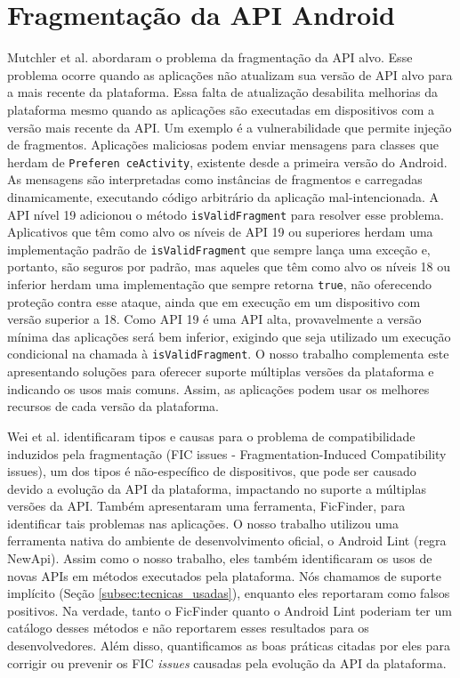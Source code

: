 \section{Fragmentação da API Android}

Mutchler et al. \cite{Mutchler2016} abordaram o problema da fragmentação da API alvo.
Esse problema ocorre quando as aplicações não atualizam sua versão de API alvo para a
mais recente da plataforma. Essa falta de atualização desabilita melhorias da plataforma
mesmo quando as aplicações são executadas em dispositivos com a versão mais recente da API.
Um exemplo é a vulnerabilidade que permite injeção de fragmentos. Aplicações maliciosas
podem enviar mensagens para classes que herdam de
\texttt{Preferen ceActivity}, %
existente
desde a primeira versão do Android. As mensagens são interpretadas como instâncias de
fragmentos e carregadas dinamicamente, executando código arbitrário da aplicação
mal-intencionada. A API nível 19 adicionou o método \texttt{isValidFragment} para resolver
esse problema. Aplicativos que têm como alvo os níveis de API 19 ou superiores herdam uma implementação padrão de \texttt{isValidFragment} que sempre lança uma exceção e, portanto,
são seguros por padrão, mas aqueles que têm como alvo os níveis 18 ou inferior herdam uma implementação que sempre retorna \texttt{true}, não oferecendo proteção contra esse ataque,
ainda que em execução em um dispositivo com versão superior a 18.  Como API 19 é uma API
alta, provavelmente a versão mínima das aplicações  será bem inferior, exigindo que seja
utilizado um execução condicional na chamada à \texttt{isValidFragment}. O nosso trabalho
complementa este apresentando soluções para oferecer suporte múltiplas versões da plataforma
e indicando os usos mais comuns. Assim, as aplicações podem usar os melhores recursos de cada
versão da plataforma. 

Wei et al. \cite{Wei2016} identificaram tipos e causas para o problema de compatibilidade
induzidos pela fragmentação (FIC issues - Fragmentation-Induced Compatibility issues), um
dos tipos é não-específico de dispositivos, que pode ser causado devido a evolução da API da
plataforma, impactando no suporte a múltiplas versões da API. Também apresentaram uma ferramenta, 
FicFinder, para identificar tais problemas nas aplicações. O nosso trabalho utilizou uma ferramenta 
nativa do ambiente de desenvolvimento oficial, o Android Lint (regra NewApi). Assim como o nosso 
trabalho, eles também identificaram os usos de novas APIs em métodos executados pela plataforma. Nós 
chamamos de suporte implícito (Seção \ref{subsec:tecnicas_usadas}), enquanto eles reportaram como 
falsos positivos. Na verdade, tanto o FicFinder quanto o Android Lint poderiam ter um catálogo desses 
métodos e não reportarem esses resultados para os desenvolvedores. Além disso, quantificamos as boas 
práticas citadas por eles para corrigir ou prevenir os FIC \textit{issues} causadas pela evolução da API da plataforma.

